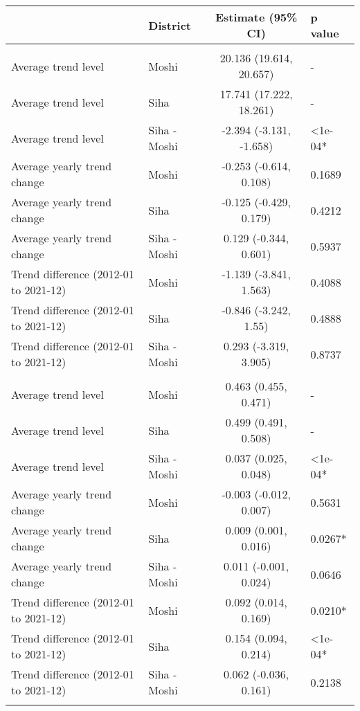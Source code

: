 \begin{longtable}{l|lcl}
\toprule
\multicolumn{1}{l}{} & District & Estimate (95\% CI) & p value \\ 
\midrule\addlinespace[2.5pt]
\multicolumn{4}{l}{PM2.5 (μg/m³)} \\ 
\midrule\addlinespace[2.5pt]
Average trend level & Moshi & 20.136 (19.614, 20.657) & - \\ 
Average trend level & Siha & 17.741 (17.222, 18.261) & - \\ 
Average trend level & Siha - Moshi & -2.394 (-3.131, -1.658) & <1e-04* \\ 
Average yearly trend change & Moshi & -0.253 (-0.614, 0.108) & 0.1689 \\ 
Average yearly trend change & Siha & -0.125 (-0.429, 0.179) & 0.4212 \\ 
Average yearly trend change & Siha - Moshi & 0.129 (-0.344, 0.601) & 0.5937 \\ 
Trend difference (2012-01 to 2021-12) & Moshi & -1.139 (-3.841, 1.563) & 0.4088 \\ 
Trend difference (2012-01 to 2021-12) & Siha & -0.846 (-3.242, 1.55) & 0.4888 \\ 
Trend difference (2012-01 to 2021-12) & Siha - Moshi & 0.293 (-3.319, 3.905) & 0.8737 \\ 
\midrule\addlinespace[2.5pt]
\multicolumn{4}{l}{Greenness (NDVI)} \\ 
\midrule\addlinespace[2.5pt]
Average trend level & Moshi & 0.463 (0.455, 0.471) & - \\ 
Average trend level & Siha & 0.499 (0.491, 0.508) & - \\ 
Average trend level & Siha - Moshi & 0.037 (0.025, 0.048) & <1e-04* \\ 
Average yearly trend change & Moshi & -0.003 (-0.012, 0.007) & 0.5631 \\ 
Average yearly trend change & Siha & 0.009 (0.001, 0.016) & 0.0267* \\ 
Average yearly trend change & Siha - Moshi & 0.011 (-0.001, 0.024) & 0.0646 \\ 
Trend difference (2012-01 to 2021-12) & Moshi & 0.092 (0.014, 0.169) & 0.0210* \\ 
Trend difference (2012-01 to 2021-12) & Siha & 0.154 (0.094, 0.214) & <1e-04* \\ 
Trend difference (2012-01 to 2021-12) & Siha - Moshi & 0.062 (-0.036, 0.161) & 0.2138 \\ 
\midrule\addlinespace[2.5pt]
\multicolumn{4}{l}{Min. temp. (ºC)} \\ 

\end{longtable}
